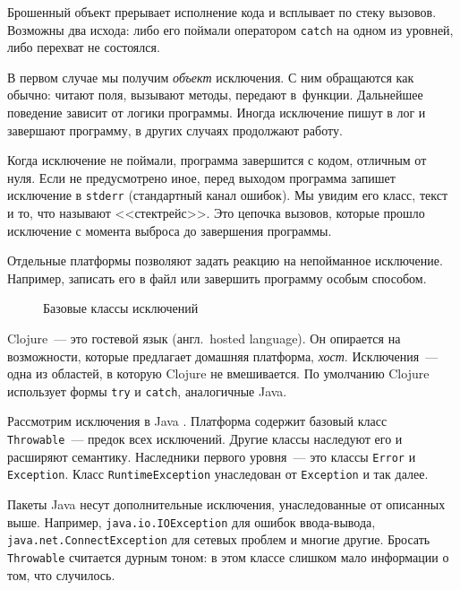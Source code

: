 Брошенный объект прерывает исполнение кода и всплывает по стеку
вызовов. Возможны два исхода: либо его поймали оператором \verb|catch| на одном
из уровней, либо перехват не состоялся.

В первом случае мы получим \emph{объект} исключения. С ним обращаются как
обычно: читают поля, вызывают методы, передают в~функции. Дальнейшее поведение
зависит от логики программы. Иногда исключение пишут в лог и завершают
программу, в других случаях продолжают работу.

Когда исключение не поймали, программа завершится с кодом, отличным от
нуля. Если не предусмотрено иное, перед выходом программа запишет исключение в
\verb|stderr| (стандартный канал ошибок). Мы увидим его класс, текст и то, что
называют <<стектрейс>>. Это цепочка вызовов, которые прошло исключение с момента
выброса до завершения программы.


Отдельные платформы позволяют задать реакцию на непойманное
исключение. Например, записать его в файл или завершить программу особым
способом.

\begin{figure}[ht!]
  \caption{Базовые классы исключений}
  \label{fig:exceptions}
\end{figure}

Clojure~--- это гостевой язык (англ.~hosted language). Он опирается на возможности,
которые предлагает домашняя платформа, \emph{хост}. Исключения~--- одна из
областей, в которую Clojure не вмешивается. По умолчанию Clojure использует
формы \verb|try| и \verb|catch|, аналогичные Java.


Рассмотрим исключения в Java . Платформа содержит
базовый класс \texttt{Throwable}~--- предок всех исключений. Другие классы наследуют
его и расширяют семантику. Наследники первого уровня~--- это классы \verb|Error| и
\verb|Exception|. Класс \verb|RuntimeException| унаследован от \verb|Exception|
и так далее.


Пакеты Java несут дополнительные исключения, унаследованные от описанных
выше. Например, \verb|java.io.IOException| для ошибок ввода-вывода,
\verb|java.net.ConnectException| для сетевых проблем и многие другие. Бросать
\verb|Throwable| считается дурным тоном: в этом классе слишком мало информации о
том, что случилось.


